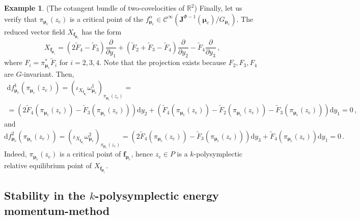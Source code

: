 \documentclass[11pt]{article}
\theoremstyle{plain}
\theoremstyle{definition}
\newtheorem{example}[theorem]{Example}
\newcommand{\R}{\mathbb{R}}
\newcommand{\Cinfty}{\mathscr{C}^\infty}
\renewcommand{\d}{\mathrm{d}}
\newcommand*{\inn}[1]{\iota_{#1}}
\def\d{\mathrm{d}}
\numberwithin{equation}{section}
\begin{document}
\begin{example}{(The cotangent bundle of two-covelocities of $\R^2$)}
Finally, let us verify that $\pi_{\boldsymbol{\mu}_e}(z_e)$ is a critical point of the $f^\alpha_{\boldsymbol{\mu}_e}\in \Cinfty(\mathbf{J}^{\Phi-1}(\boldsymbol{\mu}_e)/G_{\boldsymbol{\mu}_e})$. The reduced vector field $X_{\boldsymbol{f}_{\boldsymbol{\mu}_e}}$ has the form
\[
X_{\boldsymbol{f}_{\bm\mu_{e}}}=(2\widetilde{F}_4-\widetilde{F}_3)\frac{\partial}{\partial y_1}+(\widetilde{F}_2+\widetilde{F}_3-\widetilde{F}_4)\frac{\partial}{\partial y_2}-\widetilde{F}_4\frac{\partial}{\partial y_3}\,,
\]
where $F_i=\pi_{\boldsymbol{\mu}_e}^*\widetilde{F}_i$ for $i=2,3,4$. Note that the projection exists because $F_2, F_3, F_4$ are $G$-invariant. 
Then,
\begin{multline*}
    \d {f}^1_{\boldsymbol{\mu}_e}(\pi_{\boldsymbol{\mu}_e}(z_e)) = \left(\inn{X_{\boldsymbol{f}_{\boldsymbol{\mu}_e}}}\omega^1_{\boldsymbol{\mu}_e}\right)_{\pi_{\boldsymbol{\mu}_e}(z_e)}=\\=\left(2\widetilde{F}_4(\pi_{\boldsymbol{\mu}_e}(z_e))-\widetilde{F}_3(\pi_{\boldsymbol{\mu}_e}(z_e))\right)\d y_2+\left(\widetilde{F}_4(\pi_{\boldsymbol{\mu}_e}(z_e))-\widetilde{F}_2(\pi_{\boldsymbol{\mu}_e}(z_e))-\widetilde{F}_3(\pi_{\boldsymbol{\mu}_e}(z_e))\right)\d y_1=0\,,
\end{multline*}
and
\[
    \d {f}^2_{\boldsymbol{\mu}_e}(\pi_{\boldsymbol{\mu}_e}(z_e)) = \left(\inn{X_{\boldsymbol{f}_{\boldsymbol{\mu}_e}}}\omega^2_{\boldsymbol{\mu}_e}\right)_{\pi_{\boldsymbol{\mu}_e}(z_e)}=\left(2\widetilde{F}_4(\pi_{\boldsymbol{\mu}_e}(z_e))-\widetilde{F}_3(\pi_{\boldsymbol{\mu}_e}(z_e))\right)\d y_3+\widetilde{F}_4(\pi_{\boldsymbol{\mu}_e}(z_e))\d y_1=0\,.
\]
Indeed, $\pi_{\boldsymbol{\mu}_e}(z_e)$ is a critical point of $\boldsymbol{f}_{\bm\mu_e}$, hence $z_e\in P$ is a $k$-polysymplectic relative equilibrium point of $X_{\boldsymbol{f}_{\bm\mu_e}}$.
\end{example}

\subsection{Stability in the \texorpdfstring{$k$}{}-polysymplectic energy momentum-method}
\end{document}
